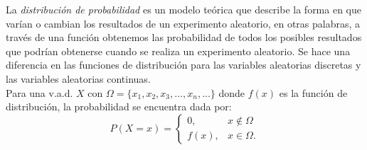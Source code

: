 \noindent La \emph{distribución de probabilidad } es un modelo teórica que describe la forma en que varían o cambian los resultados de un experimento aleatorio, en otras palabras, a través de una función obtenemos  las probabilidad de todos los posibles resultados que podrían obtenerse cuando se realiza un experimento aleatorio. Se hace una diferencia en las funciones de distribución para las variables aleatorias discretas y las variables aleatorias continuas.\\

\noindent Para  una v.a.d. $X$ con $\Omega=\{x_1,x_2, x_3,\ldots,x_n,\ldots\}$ donde $f(x)$ es la función de distribución, la probabilidad se encuentra dada por:
\begin{equation}
P(X=x)=\begin{cases}
0, & x\notin\Omega\\
f(x), & x\in\Omega.
\end{cases}
\label{eq:FP}
\end{equation}

